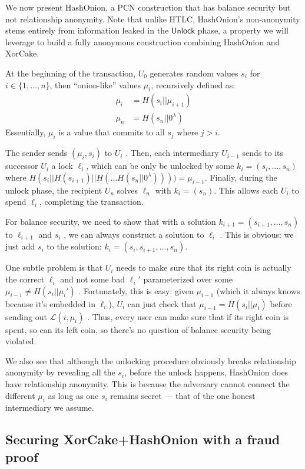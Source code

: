 \documentclass[USenglish,oneside,twocolumn]{article}
\begin{document}
We now present HashOnion, a PCN construction that has balance security but not relationship anonymity. Note that unlike HTLC, HashOnion's non-anonymity stems entirely from information leaked in the $\mathsf{Unlock}$ phase, a property we will leverage to build a fully anonymous construction combining HashOnion and XorCake.

At the beginning of the transaction, $U_0$ generates random values $s_i$ for $i\in \{1,\dots,n\}$, then ``onion-like'' values $\mu_i$, recursively defined as:
\begin{align*}
    \mu_i & = H(s_i||\mu_{i+1})   \\
    \mu_n & = H(s_n || 0^\lambda)
\end{align*}
Essentially, $\mu_i$ is a value that commits to all $s_j$ where $j>i$.

The sender sends $(\mu_i, s_i)$ to $U_i$ . Then, each intermediary $U_{i-1}$ sends to its successor $U_i$ a lock $\ell_i$, which can be only be unlocked by some $k_i = (s_i, \dots, s_n)$ where $H(s_i||H(s_{i+1})||H( \dots H(s_n || 0^\lambda) ))) = \mu_{i-1}$. Finally, during the unlock phase, the recipient $U_n$ solves $\ell_n$ with $k_i = (s_n)$. This allows each $U_i$ to spend $\ell_i$, completing the transaction.

For balance security, we need to show that with a solution $k_{i+1}=(s_{i+1}, \dots, s_{n})$ to $\ell_{i+1}$ and $s_i$ , we can always construct a solution to $\ell_i$ . This is obvious: we just add $s_i$ to the solution: $k_i=(s_i,s_{i+1}, \dots, s_n)$.

One subtle problem is that $U_i$ needs to make sure that its right coin is actually the correct $\ell_i$ and not some bad $\ell_i'$ parameterized over some $\mu_{i-1} \neq H(s_i || \mu_i')$ . Fortunately, this is easy: given $\mu_{i-1}$ (which it always knows because it's embedded in $\ell_i$), $U_i$ can just check that $\mu_{i-1} =H(s_i||\mu_i)$ before sending out $\mathcal{L}(i,\mu_i)$ . Thus, every user can make sure that if its right coin is spent, so can its left coin, so there's no question of balance security being violated.

We also see that although the unlocking procedure obviously breaks relationship anonymity by revealing all the $s_i$, before the unlock happens, HashOnion does have relationship anonymity. This is because the adversary cannot connect the different $\mu_i$ as long as one $s_i$ remains secret --- that of the one honest intermediary we assume.

\subsection{Securing XorCake+HashOnion with a fraud proof}
\end{document}
